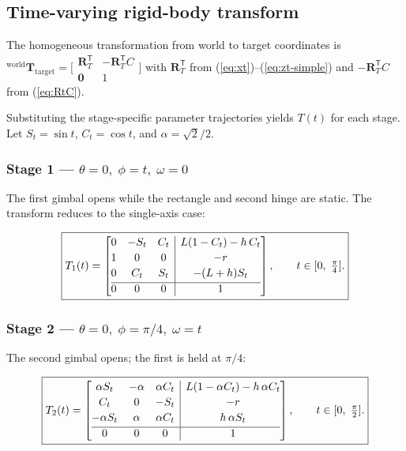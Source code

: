 \documentclass[12pt,a4paper]{article}
\newcommand{\Rd}{\mathbf{R}}
\newcommand{\RT}{\Rd_T}
\begin{document}
\subsection{Time-varying rigid-body transform}

The homogeneous transformation from world to target coordinates is
${}^{\text{world}}\mathbf{T}_{\text{target}} = \bigl[\begin{smallmatrix}
\RT^\mathsf{T} & -\RT^\mathsf{T}C \\ \mathbf{0} & 1 \end{smallmatrix}\bigr]$
with $\RT^\mathsf{T}$ from (\ref{eq:xt})--(\ref{eq:zt-simple}) and
$-\RT^\mathsf{T}C$ from (\ref{eq:RtC}).

Substituting the stage-specific parameter trajectories yields $T(t)$ for each stage.
Let $S_t = \sin t$, $C_t = \cos t$, and $\alpha = \sqrt{2}/2$.

\subsubsection{Stage 1 --- $\theta{=}0,\;\phi{=}t,\;\omega{=}0$}

The first gimbal opens while the rectangle and second hinge are static.
The transform reduces to the single-axis case:

\begin{equation}\label{eq:stage1-T}
\boxed{
T_1(t) =
\left[\begin{array}{@{}ccc|c@{}}
  0     & -S_t  &  C_t  & L(1-C_t) - h\,C_t \\[2pt]
  1     &  0    &  0    & -r \\[2pt]
  0     &  C_t  &  S_t  & -(L+h)S_t \\[2pt]
  \hline
  0     & 0     & 0     & 1
\end{array}\right],
\qquad t \in [0,\;\tfrac{\pi}{4}].
}
\end{equation}

\subsubsection{Stage 2 --- $\theta{=}0,\;\phi{=}\pi/4,\;\omega{=}t$}

The second gimbal opens; the first is held at $\pi/4$:

\begin{equation}\label{eq:stage2-T}
\boxed{
T_2(t) =
\left[\begin{array}{@{}ccc|c@{}}
  \alpha S_t & -\alpha   &  \alpha C_t  & L(1-\alpha C_t) - h\,\alpha C_t \\[2pt]
  C_t        & 0         & -S_t          & -r \\[2pt]
  -\alpha S_t & \alpha   &  \alpha C_t   & h\,\alpha S_t \\[2pt]
  \hline
  0          & 0         & 0             & 1
\end{array}\right],
\qquad t \in [0,\;\tfrac{\pi}{2}].
}
\end{equation}
\end{document}

